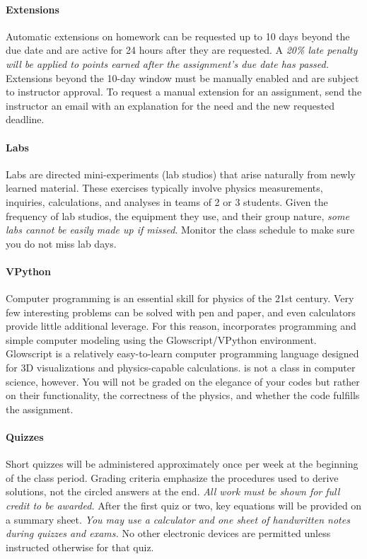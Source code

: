 \documentclass{syllabus}
\begin{document}
\paragraph{Extensions} Automatic extensions on homework can be requested up to 10 days beyond the due date and are active for 24 hours after they are requested. A \textit{20\% late penalty will be applied to points earned after the assignment's due date has passed.} Extensions beyond the 10-day window must be manually enabled and are subject to instructor approval. To request a manual extension for an assignment, send the instructor an email with an explanation for the need and the new requested deadline.

\paragraph{Labs} Labs are directed mini-experiments (lab studios) that arise naturally from newly learned material. These exercises typically involve physics measurements, inquiries, calculations, and analyses in teams of 2 or 3 students. Given the frequency of lab studios, the equipment they use, and their group nature, \textit{some labs cannot be easily made up if missed}. Monitor the class schedule to make sure you do not miss lab days.

\paragraph{VPython} Computer programming is an essential skill for physics of the 21st century. Very few interesting problems can be solved with pen and paper, and even calculators provide little additional leverage. For this reason, \coursecode{} incorporates programming and simple computer modeling using the Glowscript/VPython environment. Glowscript is a relatively easy-to-learn computer programming language designed for 3D visualizations and physics-capable calculations. \coursecode{} is not a class in computer science, however. You will not be graded on the elegance of your codes but rather on their functionality, the correctness of the physics, and whether the code fulfills the assignment.

\paragraph{Quizzes} Short quizzes will be administered approximately once per week at the beginning of the class period. Grading criteria emphasize the procedures used to derive solutions, not the circled answers at the end. \textit{All work must be shown for full credit to be awarded.} After the first quiz or two, key equations will be provided on a summary sheet. \textit{You may use a calculator and one sheet of handwritten notes during quizzes and exams.} No other electronic devices are permitted unless instructed otherwise for that quiz.
\end{document}
